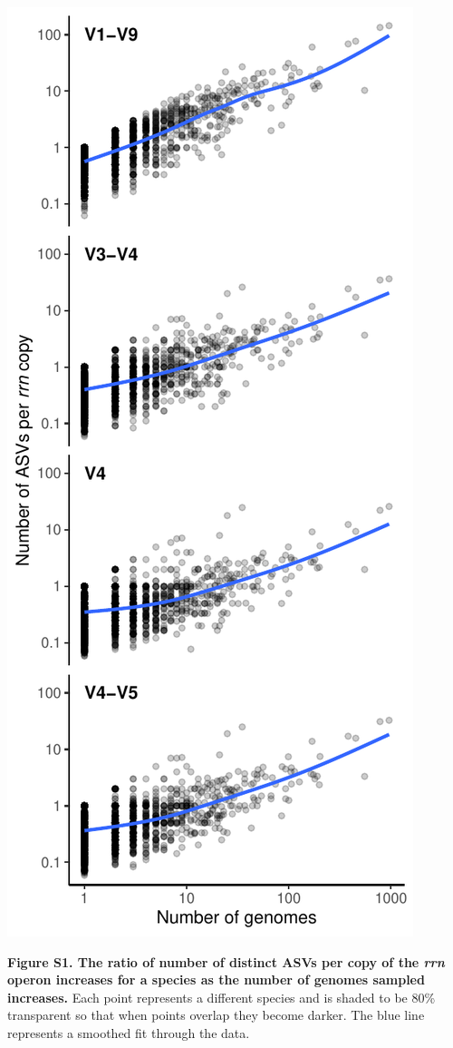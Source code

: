 \documentclass[
]{article}
\begin{document}
\includegraphics{../figures/esv_rate.pdf}

\textbf{Figure S1. The ratio of number of distinct ASVs per copy of the
\emph{rrn} operon increases for a species as the number of genomes
sampled increases.} Each point represents a different species and is
shaded to be 80\% transparent so that when points overlap they become
darker. The blue line represents a smoothed fit through the data.
\end{document}
